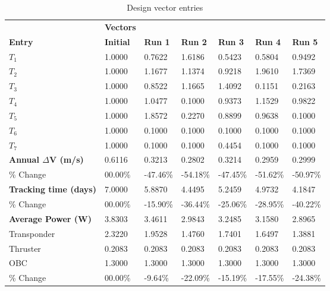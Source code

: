 \begin{table}[H]
\centering
\begin{tabular}{lllllll}
\textbf{} & \cellcolor[HTML]{EFEFEF}\textbf{Vectors} & \textbf{} & \textbf{} & \textbf{} & \textbf{} & \textbf{} \\
\rowcolor[HTML]{EFEFEF} \cellcolor[HTML]{EFEFEF}\textbf{Entry} & \cellcolor[HTML]{EFEFEF}\textbf{Initial} & \cellcolor[HTML]{EFEFEF}\textbf{Run 1} & \cellcolor[HTML]{EFEFEF}\textbf{Run 2} & \cellcolor[HTML]{EFEFEF}\textbf{Run 3} & \cellcolor[HTML]{EFEFEF}\textbf{Run 4} & \cellcolor[HTML]{EFEFEF}\textbf{Run 5} \\
$T_{1}$ & 1.0000 & 0.7622 & 1.6186 & 0.5423 & 0.5804 & 0.9492 \\
$T_{2}$ & 1.0000 & 1.1677 & 1.1374 & 0.9218 & 1.9610 & 1.7369 \\
$T_{3}$ & 1.0000 & 0.8522 & 1.1665 & 1.4092 & 0.1151 & 0.2163 \\
$T_{4}$ & 1.0000 & 1.0477 & 0.1000 & 0.9373 & 1.1529 & 0.9822 \\
$T_{5}$ & 1.0000 & 1.8572 & 0.2270 & 0.8899 & 0.9638 & 0.1000 \\
$T_{6}$ & 1.0000 & 0.1000 & 0.1000 & 0.1000 & 0.1000 & 0.1000 \\
$T_{7}$ & 1.0000 & 0.1000 & 0.1000 & 0.4454 & 0.1000 & 0.1000 \\
\rowcolor[HTML]{EFEFEF} 
\cellcolor[HTML]{EFEFEF}\textbf{Annual $\Delta \boldsymbol{V}$ (m/s)} & \cellcolor[HTML]{EFEFEF}0.6116 & 0.3213 & 0.2802 & 0.3214 & 0.2959 & 0.2999 \\
\% Change & 00.00\% &-47.46\% & -54.18\% & -47.45\% & -51.62\% & -50.97\% \\
\rowcolor[HTML]{EFEFEF} 
\cellcolor[HTML]{EFEFEF}\textbf{Tracking time (days)} & \cellcolor[HTML]{EFEFEF}7.0000 & 5.8870 & 4.4495 & 5.2459 & 4.9732 & 4.1847 \\
\% Change & 00.00\% &-15.90\% & -36.44\% & -25.06\% & -28.95\% & -40.22\% \\
\rowcolor[HTML]{EFEFEF} 
\cellcolor[HTML]{EFEFEF}\textbf{Average Power (W)} & \cellcolor[HTML]{EFEFEF}3.8303 & 3.4611 & 2.9843 & 3.2485 & 3.1580 & 2.8965 \\
Transponder & 2.3220 & 1.9528 & 1.4760 & 1.7401 & 1.6497 & 1.3881 \\
Thruster & 0.2083 & 0.2083 & 0.2083 & 0.2083 & 0.2083 & 0.2083 \\
OBC & 1.3000 & 1.3000 & 1.3000 & 1.3000 & 1.3000 & 1.3000 \\
\% Change & 00.00\% &-9.64\% & -22.09\% & -15.19\% & -17.55\% & -24.38\% \\
\end{tabular}
\caption{Design vector entries}
\label{tab:DesignVectorEntries_default28dur1len3int}
\end{table}